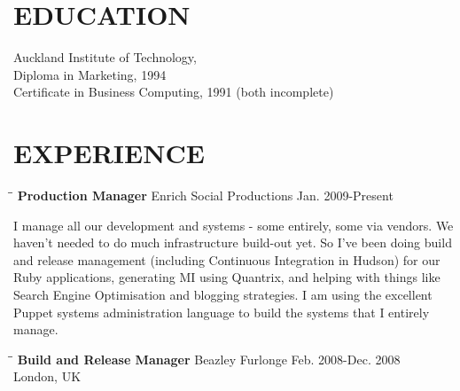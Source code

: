 \documentclass{res}
\begin{document}
 

                      
\address{12 Hammond Road \\Woking, Surrey GU21 4TQ\\(+44) 7967189579\\julian@juliansimpson.org}
                                  
\begin{resume}

\section{EDUCATION}          
    Auckland Institute of Technology,  \\        
    Diploma in Marketing, 1994   \\       
    Certificate in Business Computing, 1991 (both incomplete) %

 
\section{EXPERIENCE}
   \vspace{-0.1in}  
   \begin{tabbing}
   \hspace{2.3in}\= \hspace{2.6in}\= \kill %
    {\bf Production Manager} \>Enrich Social Productions     \>Jan. 2009-Present

   \end{tabbing}\vspace{-20pt}      %
    I manage all our development and systems - some entirely, some via vendors.  We haven't needed to do much infrastructure build-out yet.    So I've been doing build and release management (including Continuous Integration in Hudson) for our Ruby applications, generating MI using Quantrix, and helping with things like Search Engine Optimisation and blogging strategies. I am using the excellent Puppet systems administration language to build the systems that I entirely manage.
   \begin{tabbing}
   \hspace{2.3in}\= \hspace{2.6in}\= \kill %
     {\bf Build and Release Manager} \>Beazley Furlonge     \>Feb. 2008-Dec. 2008\\ 
                          \>London, UK
   \end{tabbing}\vspace{-20pt}


\end{resume}
\end{document}
